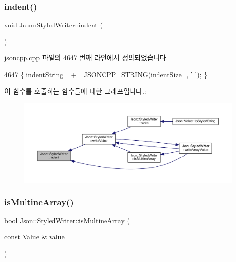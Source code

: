 \subsubsection{\texorpdfstring{indent()}{indent()}}
{\footnotesize\ttfamily void Json\+::\+Styled\+Writer\+::indent (\begin{DoxyParamCaption}{ }\end{DoxyParamCaption})\hspace{0.3cm}{\ttfamily [private]}}



jsoncpp.\+cpp 파일의 4647 번째 라인에서 정의되었습니다.


\begin{DoxyCode}
4647 \{ \hyperlink{class_json_1_1_styled_writer_a7d91709c94c152bd44eaf80faac130ae}{indentString\_} += \hyperlink{json-forwards_8h_a1e723f95759de062585bc4a8fd3fa4be}{JSONCPP\_STRING}(\hyperlink{class_json_1_1_styled_writer_a0b5ab768cc56433d463eb1f03da8614e}{indentSize\_}, \textcolor{charliteral}{' '}); \}
\end{DoxyCode}
이 함수를 호출하는 함수들에 대한 그래프입니다.\+:\nopagebreak
\begin{figure}[H]
\begin{center}
\leavevmode
\includegraphics[width=350pt]{class_json_1_1_styled_writer_a0b65be6186a7c6638270990265e42b97_icgraph}
\end{center}
\end{figure}
\mbox{\label{class_json_1_1_styled_writer_aa5dc671edf10b9976f1511da2271ab9d}} 
\subsubsection{\texorpdfstring{is\+Multine\+Array()}{isMultineArray()}}
{\footnotesize\ttfamily bool Json\+::\+Styled\+Writer\+::is\+Multine\+Array (\begin{DoxyParamCaption}\item[{const \hyperlink{class_json_1_1_value}{Value} \&}]{value }\end{DoxyParamCaption})\hspace{0.3cm}{\ttfamily [private]}}



